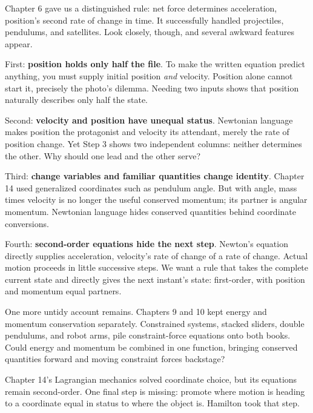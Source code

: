 
Chapter 6 gave us a distinguished rule: net force determines acceleration, position's second rate of change in time. It successfully handled projectiles, pendulums, and satellites. Look closely, though, and several awkward features appear.

First: \textbf{position holds only half the file}. To make the written equation predict anything, you must supply initial position \emph{and} velocity. Position alone cannot start it, precisely the photo's dilemma. Needing two inputs shows that position naturally describes only half the state.

Second: \textbf{velocity and position have unequal status}. Newtonian language makes position the protagonist and velocity its attendant, merely the rate of position change. Yet Step 3 shows two independent columns: neither determines the other. Why should one lead and the other serve?

Third: \textbf{change variables and familiar quantities change identity}. Chapter 14 used generalized coordinates such as pendulum angle. But with angle, mass times velocity is no longer the useful conserved momentum; its partner is angular momentum. Newtonian language hides conserved quantities behind coordinate conversions.

Fourth: \textbf{second-order equations hide the next step}. Newton's equation directly supplies acceleration, velocity's rate of change of a rate of change. Actual motion proceeds in little successive steps. We want a rule that takes the complete current state and directly gives the next instant's state: first-order, with position and momentum equal partners.

One more untidy account remains. Chapters 9 and 10 kept energy and momentum conservation separately. Constrained systems, stacked sliders, double pendulums, and robot arms, pile constraint-force equations onto both books. Could energy and momentum be combined in one function, bringing conserved quantities forward and moving constraint forces backstage?

Chapter 14's Lagrangian mechanics solved coordinate choice, but its equations remain second-order. One final step is missing: promote where motion is heading to a coordinate equal in status to where the object is. Hamilton took that step.



